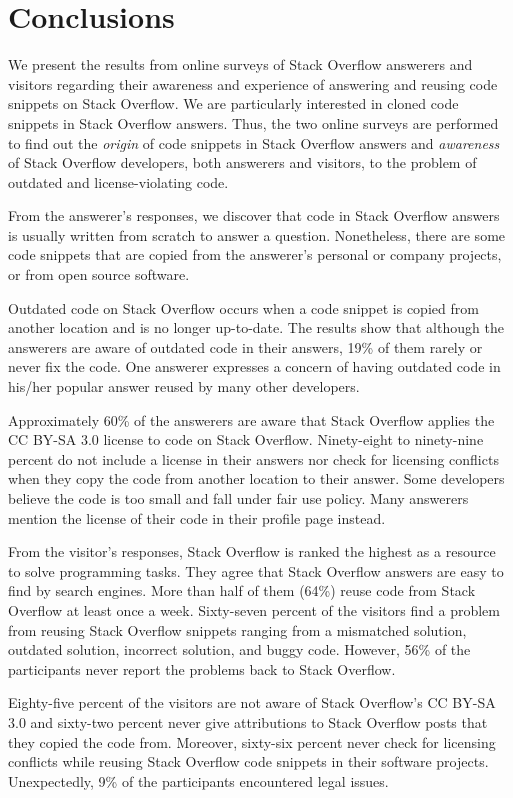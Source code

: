 \documentclass{svjour3}                     %
\begin{document}
\section{Conclusions}

We present the results from online surveys of Stack Overflow answerers and
visitors regarding their awareness and experience of answering and reusing code
snippets on Stack Overflow. We are particularly interested in cloned code
snippets in Stack Overflow answers. Thus, the two online surveys are performed to
find out the \textit{origin} of code snippets in Stack Overflow answers and
\textit{awareness} of Stack Overflow developers, both answerers and visitors,
to the problem of outdated and license-violating code.

From the answerer's responses, we discover that code in Stack Overflow answers
is usually written from scratch to answer a question. Nonetheless, there are
some code snippets that are copied from the answerer's personal or company
projects, or from open source software.

Outdated code on Stack Overflow occurs when a code snippet is
copied from another location and is no longer up-to-date. The results show that
although the answerers are aware of outdated code in their answers, 19\% of them
rarely or never fix the code. One answerer expresses a concern of having
outdated code in his/her popular answer reused
by many other developers.

Approximately 60\% of the answerers are aware that Stack Overflow
applies the CC BY-SA 3.0
license to code on Stack Overflow. Ninety-eight to ninety-nine percent
do not include a license in their answers nor check for licensing conflicts when
they copy the code from another location to their answer. Some developers
believe the code is too small and fall under fair use policy. Many answerers
mention the license of their code in their profile page instead.

From the visitor's responses, Stack Overflow is ranked the highest as a resource
to solve programming tasks. They agree that Stack Overflow answers are easy to
find by search engines. More than half of them (64\%) reuse code from Stack
Overflow at least once a week. Sixty-seven percent of the visitors find a
problem from reusing Stack Overflow snippets ranging from a mismatched solution,
outdated solution, incorrect solution, and buggy code. However, 56\% of the
participants never report the problems back to Stack Overflow.

Eighty-five percent of the visitors are not aware of Stack Overflow's CC BY-SA
3.0 and sixty-two percent never give attributions to Stack Overflow posts that they copied
the code from. Moreover, sixty-six percent never check for licensing conflicts while
reusing Stack Overflow code snippets in their software
projects. Unexpectedly, 9\%
of the participants encountered legal issues.
\end{document}
